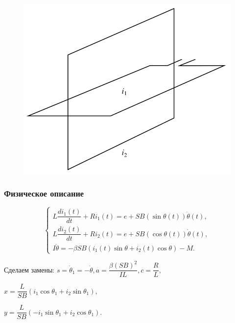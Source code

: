 \documentclass[hyperref={pdftex,unicode}]{beamer}
\begin{document}
\begin{frame}
\begin{figure}[H]
\begin{center}
\begin{minipage}[h]{0.4\linewidth}
  \includegraphics[width=1\linewidth]{obmotki}
  
  \end{minipage}    
    
  \end{center}
\end{figure}


\end{frame}


\begin{frame}

\frametitle{Физическое описание}
$$
        \left\{
                \begin{aligned}
                        L \dfrac{di_1(t)}{dt} + Ri_1(t) = e + SB(\sin\theta(t)) \dot \theta (t), \\
                        L \dfrac{di_2(t)}{dt} + Ri_2(t) = e + SB(\cos\theta(t)) \dot \theta (t),
\\
  						I \ddot \theta = -\beta SB(i_1(t)\sin\theta + i_2(t)\cos\theta) - M.
                \end{aligned}
        \right.
$$

\vspace{20pt}

Сделаем замены: $ s = \dot \theta_1 = - \dot \theta, a = \dfrac{\beta(SB)^2}{IL}, c = \dfrac{R}{L}, $

\hspace{105pt} $ x = \dfrac{L}{SB} (i_1\cos\theta_1 + i_2\sin\theta_1),$

\vspace{5pt}

\hspace{105pt} $ y = \dfrac{L}{SB} (-i_1\sin\theta_1 + i_2\cos\theta_1).$

\end{frame}
\end{document}
